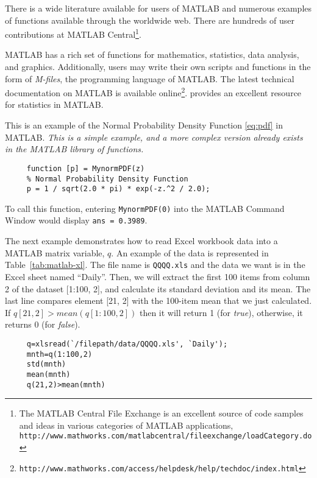 There is a wide literature available for users of MATLAB and numerous examples of functions available through the worldwide web. There are hundreds of user contributions at MATLAB Central\footnote{The MATLAB Central File Exchange is an excellent source of code samples and ideas in various categories of MATLAB applications, \\ \texttt{http://www.mathworks.com/matlabcentral/fileexchange/loadCategory.do}}.

MATLAB has a rich set of functions for mathematics, statistics, data analysis, and graphics. Additionally, users may write their own scripts and functions in the form of \emph{M-files}, the programming language of MATLAB. 
The latest technical documentation on MATLAB is available online\footnote{\texttt{http://www.mathworks.com/access/helpdesk/help/techdoc/index.html}}.  provides an excellent resource for statistics in MATLAB.

This is an example of the Normal Probability Density Function \eqref{eq:pdf} in \textsc{MATLAB}. \emph{This is a simple example, and a more complex version already exists in the MATLAB library of functions.}
\begin{verbatim}
     function [p] = MynormPDF(z)
     % Normal Probability Density Function
     p = 1 / sqrt(2.0 * pi) * exp(-z.^2 / 2.0);
\end{verbatim}
To call this function, entering \texttt{MynormPDF(0)} into the MATLAB Command Window would display \texttt{ans =  0.3989}.

The next example demonstrates how to read Excel workbook data into a MATLAB matrix variable, $q$. An example of the data is represented in Table~\ref{tab:matlab-xl}. The file name is \texttt{QQQQ.xls} and the data we want is in the Excel sheet named ``Daily''. Then, we will extract the first 100 items from column 2 of the dataset [1:100, 2], and calculate its standard deviation and its mean. The last line compares element [21, 2] with the 100-item mean that we just calculated. If $q[21,2]>mean(q[1:100,2])$ then it will return 1 (for \emph{true}), otherwise, it returns 0 (for \emph{false}).
\begin{verbatim}
     q=xlsread(`/filepath/data/QQQQ.xls', `Daily');
     mnth=q(1:100,2)
     std(mnth)
     mean(mnth)
     q(21,2)>mean(mnth)
\end{verbatim}

